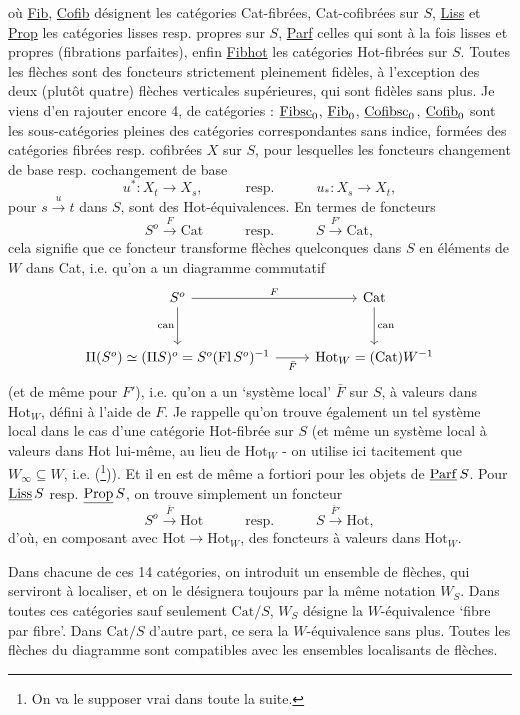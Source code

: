 où \underline{Fib}, \underline{Cofib} désignent les catégories Cat-fibrées, Cat-cofibrées sur $S$, \underline{Liss} et \underline{Prop} les catégories
lisses resp. propres sur $S$, \underline{Parf} celles qui sont à la fois lisses et propres (fibrations parfaites), enfin \underline{Fibhot} les catégories Hot-fibrées sur $S$. Toutes les flèches sont des foncteurs strictement pleinement fidèles, à l'exception des deux (plutôt quatre) flèches verticales supérieures, qui sont fidèles sans plus. Je viens d'en rajouter encore 4, de catégories : $\underline{\mathrm{Fibsc}}_0$, $\underline{\mathrm{Fib}}_0$, $\underline{\mathrm{Cofibsc}}_0$, $\underline{\mathrm{Cofib}}_0$ sont les sous-catégories pleines des catégories correspondantes sans indice, formées des catégories fibrées resp. cofibrées $X$ sur $S$, pour lesquelles les foncteurs changement de base resp. cochangement de base
\[
u^* : X_t \longrightarrow X_s, \qquad\quad \text{resp.} \qquad\quad u_* : X_s \longrightarrow X_t,
\]
pour $s \xrightarrow{u} t$ dans $S$, sont des Hot-équivalences. En termes de foncteurs
\[
S^o \xrightarrow{F} \mathrm{Cat} \qquad\quad \text{resp.} \qquad\quad S \xrightarrow{F'} \mathrm{Cat},
\]
cela signifie que ce foncteur transforme flèches quelconques dans $S$ en éléments de $W$ dans Cat, i.e. qu'on a un diagramme commutatif
\[
\begin{tikzcd}[row sep=large]
S^o \arrow[r, "F"] \arrow[d, "\mathrm{can}"'] & \mathrm{Cat} \arrow[d, "\mathrm{can}"] \\
\Pi(S^o) \simeq (\Pi S)^o = S^o(\mathrm{Fl}\,S^o)^{-1} \arrow[r, "\bar F"'] & \mathrm{Hot}_W = (\mathrm{Cat})W^{-1}
\end{tikzcd}
\]
(et de même pour $F'$), i.e. qu'on a un `système
local' $\bar F$ sur $S$, à valeurs dans $\mathrm{Hot}_W$, défini à l'aide de $F$. Je rappelle qu'on trouve également un tel système local dans le cas d'une catégorie Hot-fibrée sur $S$ (et même un système local à valeurs dans Hot lui-même, au lieu de $\mathrm{Hot}_W$ - on utilise ici tacitement que $W_\infty \subseteq W$, i.e.  (\footnote[5]{On va le supposer vrai dans toute la suite.})). Et il en est de même a fortiori pour les objets de $\underline{\mathrm{Parf}}\,S$. Pour $\underline{\mathrm{Liss}}\,S$ resp. $\underline{\mathrm{Prop}}\,S$, on trouve simplement un foncteur
\[
S^o \xrightarrow{\bar F} \mathrm{Hot} \qquad\quad \text{resp.} \qquad\quad S \xrightarrow{\bar F'} \mathrm{Hot},
\]
d'où, en composant avec $\mathrm{Hot} \longrightarrow \mathrm{Hot}_W$, des foncteurs à valeurs dans $\mathrm{Hot}_W$.

Dans chacune de ces 14 catégories, on introduit un ensemble de flèches, qui serviront à localiser, et on le désignera toujours par la même notation $W_S$. Dans toutes ces catégories sauf seulement $\mathrm{Cat}/S$, $W_S$ désigne la $W$-équivalence `fibre par fibre'. Dans $\mathrm{Cat}/S$ d'autre part, ce sera la $W$-équivalence sans plus. Toutes les flèches du diagramme sont compatibles avec les ensembles localisants de flèches.

